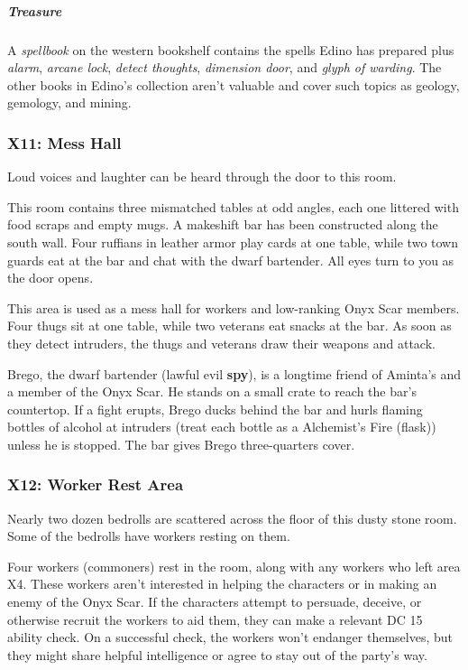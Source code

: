 \documentclass[10pt,a4paper,twoside,bg=print,twocolumn,openany,nodeprecatedcode]{dndbook}
\begin{document}
\subparagraph{Treasure}
A \textit{spellbook} on the western bookshelf contains the spells Edino has prepared plus \textit{alarm}, \textit{arcane lock}, \textit{detect thoughts}, \textit{dimension door}, and \textit{glyph of warding}. The other books in Edino's collection aren't valuable and cover such topics as geology, gemology, and mining.

\subsubsection{X11: Mess Hall}
Loud voices and laughter can be heard through the door to this room.

\begin{DndReadAloud}{}
This room contains three mismatched tables at odd angles, each one littered with food scraps and empty mugs. A makeshift bar has been constructed along the south wall. Four ruffians in leather armor play cards at one table, while two town guards eat at the bar and chat with the dwarf bartender. All eyes turn to you as the door opens.

\end{DndReadAloud}

This area is used as a mess hall for workers and low-ranking Onyx Scar members. Four thugs sit at one table, while two veterans eat snacks at the bar. As soon as they detect intruders, the thugs and veterans draw their weapons and attack.

Brego, the dwarf bartender (lawful evil \textbf{spy}), is a longtime friend of Aminta's and a member of the Onyx Scar. He stands on a small crate to reach the bar's countertop. If a fight erupts, Brego ducks behind the bar and hurls flaming bottles of alcohol at intruders (treat each bottle as a Alchemist's Fire (flask)) unless he is stopped. The bar gives Brego three-quarters cover.

\subsubsection{X12: Worker Rest Area}
\begin{DndReadAloud}{}
Nearly two dozen bedrolls are scattered across the floor of this dusty stone room. Some of the bedrolls have workers resting on them.

\end{DndReadAloud}

Four workers (commoners) rest in the room, along with any workers who left area X4. These workers aren't interested in helping the characters or in making an enemy of the Onyx Scar. If the characters attempt to persuade, deceive, or otherwise recruit the workers to aid them, they can make a relevant DC 15 ability check. On a successful check, the workers won't endanger themselves, but they might share helpful intelligence or agree to stay out of the party's way.
\end{document}
